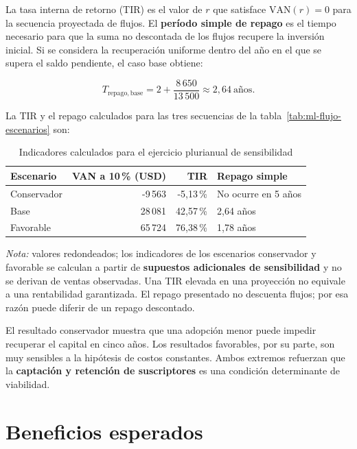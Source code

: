 La tasa interna de retorno (TIR) es el valor de $r$ que satisface $\mathrm{VAN}(r)=0$ para la secuencia proyectada de flujos. El \textbf{período simple de repago} es el tiempo necesario para que la suma no descontada de los flujos recupere la inversión inicial. Si se considera la recuperación uniforme dentro del año en el que se supera el saldo pendiente, el caso base obtiene:

\begin{equation}
T_{\mathrm{repago,base}}=2+\frac{8\,650}{13\,500}\approx 2{,}64\ \text{años}.\label{eq:ml-repago}
\end{equation}

La TIR y el repago calculados para las tres secuencias de la tabla~\ref{tab:ml-flujo-escenarios} son:

\begin{table}[htbp]
\centering
\caption{Indicadores calculados para el ejercicio plurianual de sensibilidad}
\label{tab:ml-indicadores-escenarios}
\small
\begin{tabularx}{\textwidth}{@{}X r r X@{}}
\toprule
\textbf{Escenario} & \textbf{VAN a 10\,\% (USD)} & \textbf{TIR} & \textbf{Repago simple} \\
\midrule
Conservador & -9\,563 & -5{,}13\,\% & No ocurre en 5 años \\
Base & 28\,081 & 42{,}57\,\% & 2{,}64 años \\
Favorable & 65\,724 & 76{,}38\,\% & 1{,}78 años \\
\bottomrule
\end{tabularx}
\end{table}

\noindent\textit{Nota:} valores redondeados; los indicadores de los escenarios conservador y favorable se calculan a partir de \textbf{supuestos adicionales de sensibilidad} y no se derivan de ventas observadas. Una TIR elevada en una proyección no equivale a una rentabilidad garantizada. El repago presentado no descuenta flujos; por esa razón puede diferir de un repago descontado.

El resultado conservador muestra que una adopción menor puede impedir recuperar el capital en cinco años. Los resultados favorables, por su parte, son muy sensibles a la hipótesis de costos constantes. Ambos extremos refuerzan que la \textbf{captación y retención de suscriptores} es una condición determinante de viabilidad.

\section{Beneficios esperados}\label{sec:ml-beneficios}

